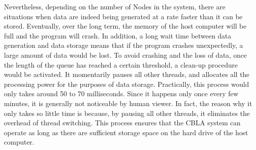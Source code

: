 Nevertheless, depending on the number of Nodes in the system, there are situations when data are indeed being generated at a rate faster than it can be stored. Eventually, over the long term, the memory of the host computer will be full and the program will crash. In addition, a long wait time between data generation and data storage means that if the program crashes unexpectedly, a large amount of data would be lost. To avoid crashing and the loss of data, once the length of the queue has reached a certain threshold, a clean-up procedure would be activated. It momentarily pauses all other threads, and allocates all the processing power for the purposes of data storage. Practically, this process would only takes around 50 to 70 milliseconds. Since it happens only once every few minutes, it is generally not noticeable by human viewer. In fact, the reason why it only takes so little time is because, by pausing all other threads, it eliminates the overhead of thread switching. This process ensures that the CBLA system can operate as long as there are sufficient storage space on the hard drive of the host computer. 

